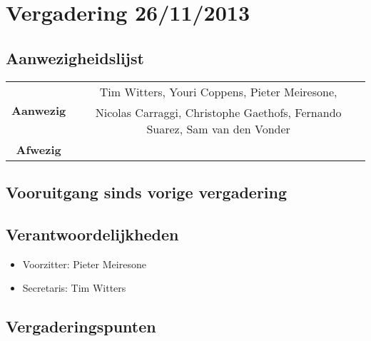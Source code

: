\section{Vergadering 26/11/2013}
\subsection{Aanwezigheidslijst}
\begin{table}[htbp]
	\centering
	\begin{tabular}{c|c}
		\multirow{2}{*}{\textbf{Aanwezig}} & Tim Witters, Youri Coppens, Pieter Meiresone, \\
		& Nicolas Carraggi,  Christophe Gaethofs, Fernando Suarez, Sam van den Vonder \\
		\hline
		\textbf{Afwezig} & \\
	\end{tabular}
\end{table}

\subsection{Vooruitgang sinds vorige vergadering}


\subsection{Verantwoordelijkheden}
\begin{itemize}
	\item Voorzitter: Pieter Meiresone
	\item Secretaris: Tim Witters
\end{itemize}
\subsection{Vergaderingspunten}

